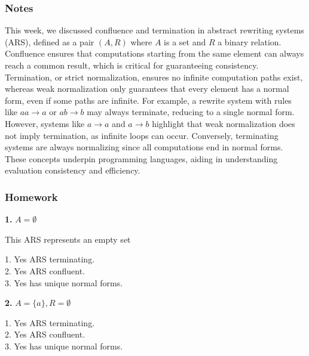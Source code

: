 \documentclass{article}
\theoremstyle{theorem}
\theoremstyle{definition}
\theoremstyle{remark}
\begin{document}
\subsubsection*{Notes}
This week, we discussed confluence and termination in abstract rewriting systems (ARS), defined as a pair \((A, R)\) where \(A\) is a set and \(R\) a binary relation. Confluence ensures that computations starting from the same element can always reach a common result, which is critical for guaranteeing consistency. Termination, or strict normalization, ensures no infinite computation paths exist, whereas weak normalization only guarantees that every element has a normal form, even if some paths are infinite. For example, a rewrite system with rules like \(aa \to a\) or \(ab \to b\) may always terminate, reducing to a single normal form. However, systems like \(a \to a\) and \(a \to b\) highlight that weak normalization does not imply termination, as infinite loops can occur. Conversely, terminating systems are always normalizing since all computations end in normal forms. These concepts underpin programming languages, aiding in understanding evaluation consistency and efficiency.


\subsubsection*{Homework}

\textbf{1.} \( A = \emptyset \)
\begin{center}
  This ARS represents an empty set
\end{center}
\hspace*{0.6cm}1. Yes ARS terminating. \\
\hspace*{0.6cm}2. Yes ARS confluent. \\
\hspace*{0.6cm}3. Yes has unique normal forms.

\textbf{2.} \( A = \{a\}, R = \emptyset \)
\begin{center}
\end{center}
\hspace*{0.6cm}1. Yes ARS terminating. \\
\hspace*{0.6cm}2. Yes ARS confluent. \\
\hspace*{0.6cm}3. Yes has unique normal forms.
\end{document}
